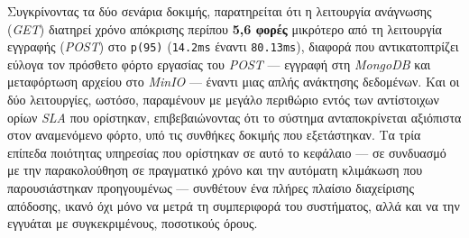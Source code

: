 Συγκρίνοντας τα δύο σενάρια δοκιμής, παρατηρείται ότι η λειτουργία ανάγνωσης (\textit{GET}) διατηρεί χρόνο απόκρισης περίπου \textbf{5,6 φορές} μικρότερο από τη λειτουργία εγγραφής (\textit{POST}) στο \texttt{p(95)} (\texttt{14.2ms} έναντι \texttt{80.13ms}), διαφορά που αντικατοπτρίζει εύλογα τον πρόσθετο φόρτο εργασίας του \textit{POST} --- εγγραφή στη \textit{MongoDB} και μεταφόρτωση αρχείου στο \textit{MinIO} --- έναντι μιας απλής ανάκτησης δεδομένων. Και οι δύο λειτουργίες, ωστόσο, παραμένουν με μεγάλο περιθώριο εντός των αντίστοιχων ορίων \textit{SLA} που ορίστηκαν, επιβεβαιώνοντας ότι το σύστημα ανταποκρίνεται αξιόπιστα στον αναμενόμενο φόρτο, υπό τις συνθήκες δοκιμής που εξετάστηκαν. Τα τρία επίπεδα ποιότητας υπηρεσίας που ορίστηκαν σε αυτό το κεφάλαιο --- σε συνδυασμό με την παρακολούθηση σε πραγματικό χρόνο και την αυτόματη κλιμάκωση που παρουσιάστηκαν προηγουμένως --- συνθέτουν ένα πλήρες πλαίσιο διαχείρισης απόδοσης, ικανό όχι μόνο να μετρά τη συμπεριφορά του συστήματος, αλλά και να την εγγυάται με συγκεκριμένους, ποσοτικούς όρους.


